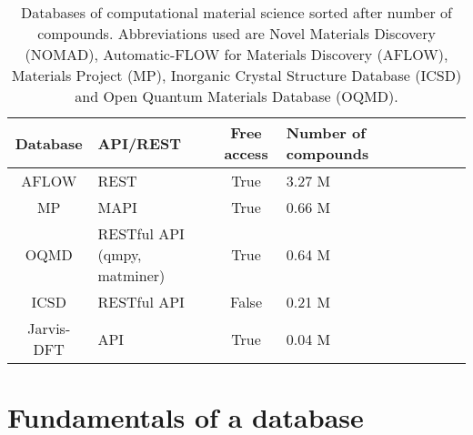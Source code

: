 \begin{table}[!ht]
\centering
\begin{tabular}{clclclclc}
  \hline
  \hline
  Database & API/REST & Free access & Number of compounds \\
  \hline
  AFLOW \cite{Curtarolo2012} & REST & True &  3.27 M\\
  MP \cite{Jain2013}   & MAPI \cite{Ong2015} & True &  0.66 M\\
  OQMD \cite{Kirklin2015, Saal2013} & RESTful API (qmpy, matminer)& True &  0.64 M\\
  ICSD \cite{Levin2020} & RESTful API & False &  0.21 M\\
  Jarvis-DFT \cite{Choudhary2020} & API & True &  0.04 M\\
  \hline
  \hline
\end{tabular}
\caption{Databases of computational material science sorted after number of compounds. Abbreviations used are Novel Materials Discovery (NOMAD), Automatic-FLOW for Materials Discovery (AFLOW), Materials Project (MP), Inorganic Crystal Structure Database (ICSD) and Open Quantum Materials Database (OQMD).}
\label{tab:databases}
\end{table}

\begin{table}[!ht]
\centering
\noindent{}
\caption{Cloud services that offers database-storage. Abbreviations used are Computational Materials Repository (CMR), NIMS Materials Database (MatNavi), PRedictive Integrated Structural Materials Science (PRISMS), Materials Platform for Data Science (MPDS) and the Materials Data Fascility (MDF).}
\label{tab:cloud_service}
\end{table}

\clearpage

\section{Fundamentals of a database}

